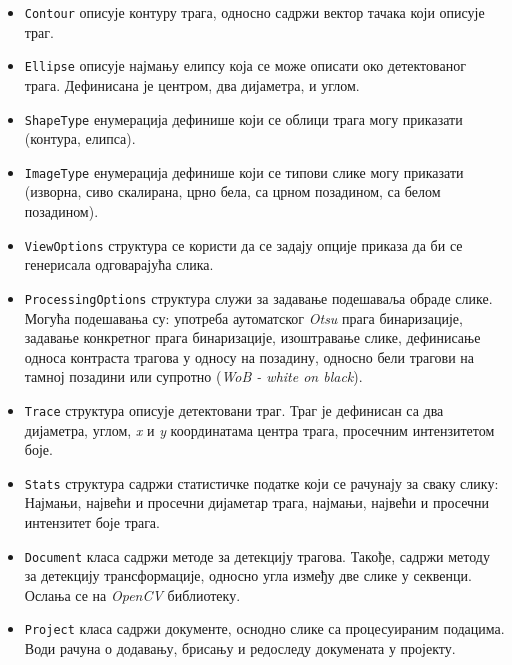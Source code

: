 \documentclass[11pt,a4paper,serbian,oneside]{book}
\begin{document}
\begin{itemize}
  \item \texttt{Contour} описује контуру трага, односно садржи вектор тачака који описује траг.
  \item \texttt{Ellipse} описује најмању елипсу која се може описати око детектованог трага. Де\-фи\-ни\-са\-на је центром, два дијаметра, и углом.
  \item \texttt{ShapeType} енумерација дефинише који се облици трага могу приказати (контура, елипса).
  \item \texttt{ImageType} енумерација дефинише који се типови слике могу приказати (изворна, сиво скалирана, црно бела, са црном позадином, са белом позадином).
  \item \texttt{ViewOptions} структура се користи да се задају опције приказа да би се генерисала одговарајућа слика. 
  \item \texttt{ProcessingOptions} структура служи за задавање подешаваља обраде слике. Могућа подешавања су: употреба аутоматског \textit{Otsu} прага бинаризације, задавање конкретног прага бинаризације, изоштравање слике, дефинисање односа контраста трагова у односу на позадину, односно бели трагови на тамној позадини или супротно (\textit{WoB - white on black}).
  \item \texttt{Trace} структура описује детектовани траг. Траг је дефинисан са два дијаметра, углом, \textit{x} и \textit{y} координатама центра трага, просечним интензитетом боје.
  \item \texttt{Stats} структура садржи статистичке податке који се рачунају за сваку слику: Нај\-ма\-њи, највећи и просечни дијаметар трага, најмањи, највећи и просечни интензитет боје трага.
  \item \texttt{Document} класа садржи методе за детекцију трагова. Такође, садржи методу за детекцију трансформације, односно угла између две слике у секвенци. Ослања се на \textit{OpenCV} библиотеку.
  \item \texttt{Project} класа садржи документе, оснодно слике са процесуираним подацима. Води рачуна о додавању, брисању и  редоследу докумената у пројекту.
\end{itemize}
\end{document}
